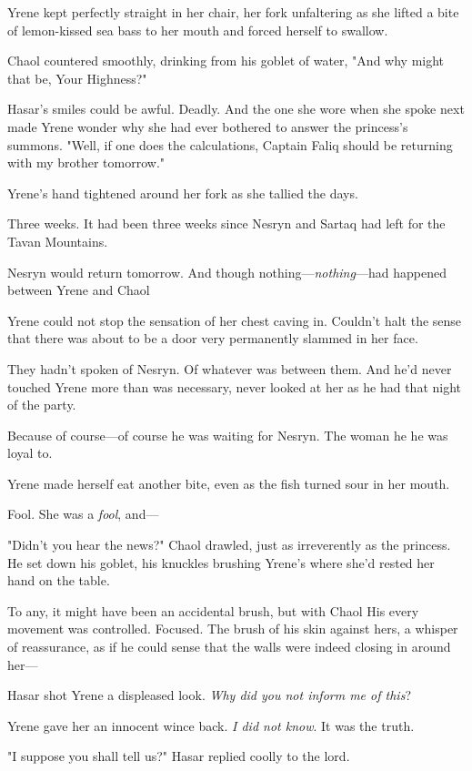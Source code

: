 Yrene kept perfectly straight in her chair, her fork unfaltering as she lifted a bite of lemon-kissed sea bass to her mouth and forced herself to swallow.

Chaol countered smoothly, drinking from his goblet of water, "And why might that be, Your Highness?"

Hasar's smiles could be awful. Deadly. And the one she wore when she spoke next made Yrene wonder why she had ever bothered to answer the princess's summons. "Well, if one does the calculations, Captain Faliq should be returning with my brother tomorrow."

Yrene's hand tightened around her fork as she tallied the days.

Three weeks. It had been three weeks since Nesryn and Sartaq had left for the Tavan Mountains.

Nesryn would return tomorrow. And though nothing---\emph{nothing}---had happened between Yrene and Chaol 

Yrene could not stop the sensation of her chest caving in. Couldn't halt the sense that there was about to be a door very permanently slammed in her face.

They hadn't spoken of Nesryn. Of whatever was between them. And he'd never touched Yrene more than was necessary, never looked at her as he had that night of the party.

Because of course---of course he was waiting for Nesryn. The woman he
 he was loyal to.

Yrene made herself eat another bite, even as the fish turned sour in her mouth.

Fool. She was a \emph{fool}, and---

"Didn't you hear the news?" Chaol drawled, just as irreverently as the princess. He set down his goblet, his knuckles brushing Yrene's where she'd rested her hand on the table.

To any, it might have been an accidental brush, but with Chaol 
His every movement was controlled. Focused. The brush of his skin against hers, a whisper of reassurance, as if he could sense that the walls were indeed closing in around her---

Hasar shot Yrene a displeased look. \emph{Why did you not inform me of this}?

Yrene gave her an innocent wince back. \emph{I did not know}. It was the truth.

"I suppose you shall tell us?" Hasar replied coolly to the lord.

